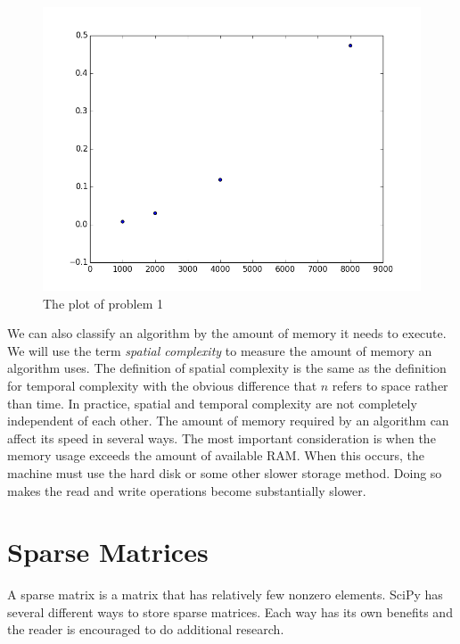 \begin{figure}
\centering
\includegraphics[width=\textwidth]{prob1.pdf}
\caption{The plot of problem 1}
\label{prob1}
\end{figure}

We can also classify an algorithm by the amount of memory it needs to execute.  We will use the term \emph{spatial complexity} to measure the amount of memory an algorithm uses.  The definition of spatial complexity is the same as the definition for temporal complexity with the obvious difference that $n$ refers to space rather than time.
In practice, spatial and temporal complexity are not completely independent of each other. The amount of memory required by an algorithm can affect its speed in several ways. The most important consideration is when the memory usage exceeds the amount of available RAM. When this occurs, the machine must use the hard disk or some other slower storage method. Doing so makes the read and write operations become substantially slower.

\section*{Sparse Matrices}
A sparse matrix is a matrix that has relatively few nonzero elements.
SciPy has several different ways to store sparse matrices. Each way has its own benefits and the reader is encouraged to do additional research. 

